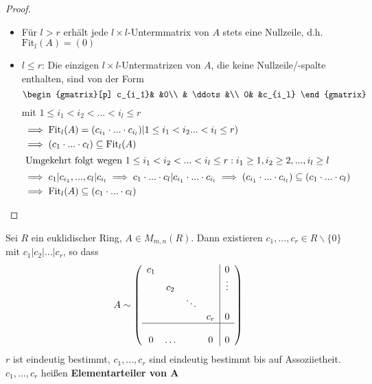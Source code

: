 \documentclass[a4paper, titlepage]{article}
\theoremstyle{definition}
\newcommand{\Fit}{\mathrm{Fit}}
\begin{document}
\begin{proof}
    \begin{itemize}
    \item Für $l>r$ erhält jede $l\times l$-Untermmatrix von $A$ stets eine Nullzeile, d.h. $\Fit_{l}(A)=(0)$
    \item $l\leq r$: Die einzigen $l\times l$-Untermatrizen von $A$, die keine Nullzeile/-spalte enthalten, sind von der Form
        $$\begin{gmatrix}[p]
            c_{i_1}& &0\\
            & \ddots &\\
            0& &c_{i_l}
        \end{gmatrix}$$
        mit $1\leq i_1<i_2<...<i_l\leq r$
        \begin{align*}
            &\implies \Fit_{l}(A)=(c_{i_1}\cdot ... \cdot c_{i_l})| 1\leq i_1<i_2...<i_l\leq r)\\
            &\implies (c_1\cdot ...\cdot c_l)\subseteq \Fit_{l}(A)\\
            \intertext{ Umgekehrt folgt wegen $ 1\leq i_1<i_2<...<i_l\leq r: i_1\geq 1,i_2\geq 2, ..., i_l\geq l$}
            &\implies c_1|c_{i_1},...,c_l|c_{i_l}\implies c_1\cdot ... \cdot c_l|c_{i_1}\cdot ... \cdot c_{i_l} \implies (c_{i_1}\cdot ...\cdot c_{i_l})\subseteq (c_1\cdot ...\cdot c_l)\\
            &\implies \Fit_{l}(A) \subseteq (c_1\cdot ... \cdot c_l)
        \end{align*}
    \end{itemize}
\end{proof}
\begin{satz}
    Sei $R$ ein euklidischer Ring, $A\in M_{m,n}(R)$. Dann existieren $c_1,...,c_r\in R\backslash\{0\}$ mit $c_1|c_2|...|c_r$, so dass 
    $$A\sim \left(\begin{array}{cccc|c}
        c_1& & & &0\\
        & c_2& & & \vdots \\  
        & & \ddots& & \\
        & & & c_r&0 \\
        \hline & & & & \\
        0&\hdots &\ &0 & 0\\
    \end{array}\right)$$
$r$ ist eindeutig bestimmt, $c_1,...,c_r$ sind eindeutig bestimmt bis auf Assoziietheit. $c_1,...,c_r$ heißen \textbf{Elementarteiler von A}
\end{satz}
\end{document}
